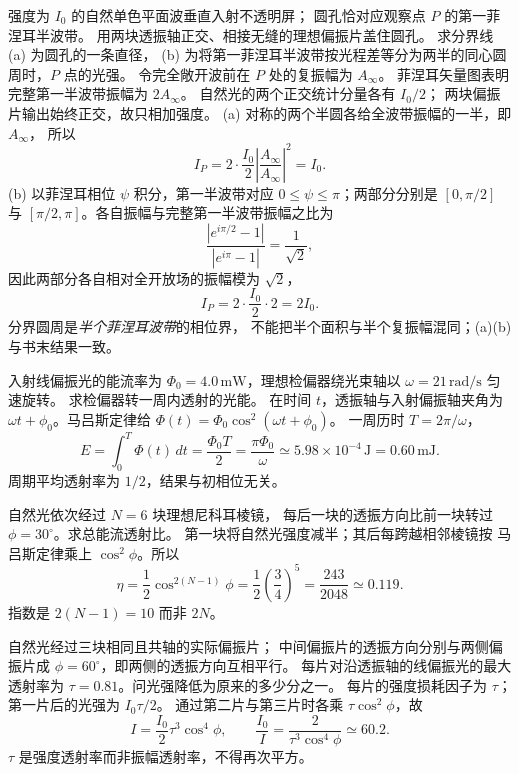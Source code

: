 
强度为 $I_0$ 的自然单色平面波垂直入射不透明屏；
圆孔恰对应观察点 $P$ 的第一菲涅耳半波带。
用两块透振轴正交、相接无缝的理想偏振片盖住圆孔。
求分界线 (a) 为圆孔的一条直径，
(b) 为将第一菲涅耳半波带按光程差等分为两半的同心圆周时，$P$ 点的光强。
\exsolution
令完全敞开波前在 $P$ 处的复振幅为 $A_\infty$。
菲涅耳矢量图表明完整第一半波带振幅为 $2A_\infty$。
自然光的两个正交统计分量各有 $I_0/2$；
两块偏振片输出始终正交，故只相加强度。
(a) 对称的两个半圆各给全波带振幅的一半，即 $A_\infty$，
所以
\[
 I_P=2\cdot\frac{I_0}{2}
 \left|\frac{A_\infty}{A_\infty}\right|^2
 =\boxed{I_0}.
\]
(b) 以菲涅耳相位 $\psi$ 积分，第一半波带对应
$0\le\psi\le\pi$；两部分分别是 $[0,\pi/2]$ 与
$[\pi/2,\pi]$。各自振幅与完整第一半波带振幅之比为
\[
 \frac{|e^{i\pi/2}-1|}{|e^{i\pi}-1|}=\frac1{\sqrt2},
\]
因此两部分各自相对全开放场的振幅模为 $\sqrt2$，
\[
 I_P=2\cdot\frac{I_0}{2}\cdot 2
 =\boxed{2I_0}.
\]
\excheck 分界圆周是\emph{半个菲涅耳波带}的相位界，
不能把半个面积与半个复振幅混同；(a)(b) 与书末结果一致。

入射线偏振光的能流率为
$\Phi_0=4.0\,\mathrm{mW}$，理想检偏器绕光束轴以
$\omega=21\,\mathrm{rad/s}$ 匀速旋转。
求检偏器转一周内透射的光能。
\exsolution
在时间 $t$，透振轴与入射偏振轴夹角为
$\omega t+\phi_0$。马吕斯定律给
$\Phi(t)=\Phi_0\cos^2(\omega t+\phi_0)$。
一周历时 $T=2\pi/\omega$，
\[
 E=\int_0^T\Phi(t)\,dt
 =\frac{\Phi_0 T}{2}
 =\boxed{\frac{\pi\Phi_0}{\omega}
 \simeq 5.98\times10^{-4}\,\mathrm{J}=0.60\,\mathrm{mJ}}.
\]
\excheck 周期平均透射率为 $1/2$，结果与初相位无关。

自然光依次经过 $N=6$ 块理想尼科耳棱镜，
每后一块的透振方向比前一块转过
$\phi=30^\circ$。求总能流透射比。
\exsolution
第一块将自然光强度减半；其后每跨越相邻棱镜按
马吕斯定律乘上 $\cos^2\phi$。所以
\[
 \boxed{\eta=\frac12\cos^{2(N-1)}\phi
 =\frac12\left(\frac34\right)^5
 =\frac{243}{2048}\simeq0.119}.
\]
\excheck 指数是 $2(N-1)=10$ 而非 $2N$。

自然光经过三块相同且共轴的实际偏振片；
中间偏振片的透振方向分别与两侧偏振片成
$\phi=60^\circ$，即两侧的透振方向互相平行。
每片对沿透振轴的线偏振光的最大透射率为
$\tau=0.81$。问光强降低为原来的多少分之一。
\exsolution
每片的强度损耗因子为 $\tau$；
第一片后的光强为 $I_0\tau/2$。
通过第二片与第三片时各乘 $\tau\cos^2\phi$，故
\[
 I=\frac{I_0}{2}\tau^3\cos^4\phi,\qquad
 \boxed{\frac{I_0}{I}=\frac{2}{\tau^3\cos^4\phi}
 \simeq60.2}.
\]
\excheck $\tau$ 是强度透射率而非振幅透射率，不得再次平方。


